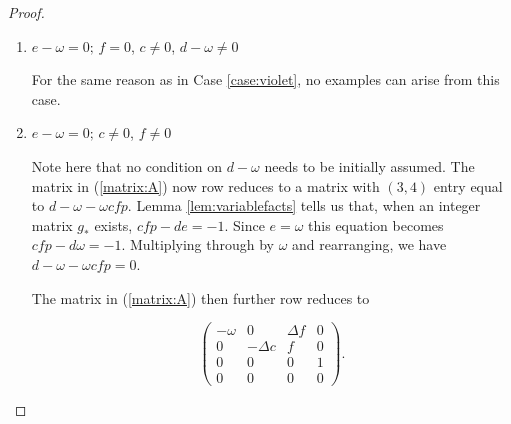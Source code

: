 \documentclass{amsart}     %
\theoremstyle{definition}
\begin{document}
\begin{proof}
\begin{enumerate}
This matrix row reduces to a matrix $N$ with $n_{1, 1} = n_{2, 2} = n_{3, 4} = 1$ and all other entries 0. Then the eigenspace consists of vectors of the form $(0,0,z,0)^T$, where $z \in \mathbb Q$. Then the integral vectors $(k,\ell,m,n)^T$ of this form result in the matrix  
\[g_* = \omega\begin{pmatrix}  1 & 0 & 0 & \varepsilon \Delta m \\
 mp &  \Delta & \varepsilon  m & 0 \\ 
0 & 0 &  1 & -\Delta mp \\ 
0 & 0 & 0 & \Delta \end{pmatrix},\]
%
and $(a',x',b',y')^T = \omega(a + \Delta \varepsilon  my, mpa + \Delta x + \varepsilon mb, b - \Delta  mpy, \Delta y)^T$. Given these expressions for the primed variables in terms of the unprimed ones, $f = 0$ and $d = e = \omega$. Further, $c = \Delta\omega m$, so the condition that $c \neq 0$ is equivalent to the condition that $m \neq 0$. The determinant condition holds as well, and we have the examples $(a',x',b',y')^T = \omega(a + \Delta \varepsilon my, mpa + \Delta x + \varepsilon mb, b - \Delta  mpy, \Delta y)^T$ with $m\neq0$, listed in part (\ref{list:lav}) of the theorem.



\item $e - \omega = 0; \, f = 0$, $c \neq 0$, $d - \omega   \neq 0$

For the same reason as in Case \ref{case:violet}, no examples can arise from this case.



\item\label{case:navy} $e - \omega = 0; \, c \neq 0$, $f \neq 0$ 

Note here that no condition on $d - \omega$ needs to be initially assumed. The matrix in (\ref{matrix:A}) now row reduces to a matrix with $(3, 4)$ entry equal to $d - \omega   - \omega  cfp$. Lemma \ref{lem:variablefacts} tells us that, when an integer matrix $g_*$ exists, $cfp - de = -1$. Since $e = \omega$ this equation becomes $cfp - d \omega= -1$. Multiplying through by $\omega$ and rearranging, we have $d - \omega - \omega cfp = 0$.

The matrix in (\ref{matrix:A}) then further row reduces to 

\[  \begin{pmatrix} -\omega  & 0 & \Delta f & 0 \\
 0&  -\Delta c & f & 0 \\ 
0& 0 & 0  & 1 \\ 
0 &0 &0 & 0 \end{pmatrix}.\]


\end{enumerate}
\end{proof}
\end{document}
